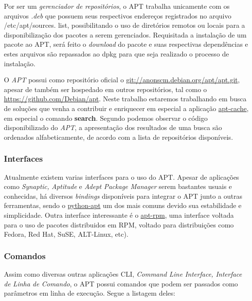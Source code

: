 Por ser um \textit{gerenciador de repositórios}, o {\code APT} trabalha unicamente com os arquivos \textit{.deb} que possuem seus respectivos endereços registrados no arquivo {\code/etc/apt/sources. list}, possibilitando o uso de diretórios remotos ou locais para a disponibilização dos pacotes a serem gerenciados. Requisitada a instalação de um pacote ao {\code APT}, será feito o \textit{download} do pacote e  suas respectivas dependências e estes arquivos são repassados ao {\code dpkg} para que seja realizado o processo de instalação.

O \textit{APT} possui como repositório oficial o \url{git://anonscm.debian.org/apt/apt.git}, apesar de também ser hospedado em outros repositórios, tal como o \url{https://github.com/Debian/apt}. Neste trabalho estaremos trabalhando em busca de soluções que venha a contribuir e enriquecer em especial a aplicação \href{https://github.com/Debian/apt/blob/debian/experimental/cmdline/apt-cache.cc}{apt-cache}, em especial o comando \textbf{search}. Segundo podemos observar o código disponibilizado do \textit{APT}, a apresentação dos resultados de uma busca são ordenados alfabeticamente, de acordo com a lista de repositórios disponíveis.


\subsubsection*{Interfaces} %
\label{ssub:interfaces}
Atualmente existem varias interfaces para o uso do APT. Apesar de aplicações como \textit{Synaptic, Aptitude} e \textit{Adept Package Manager} serem bastantes usuais e conhecidas, há diversos \textit{bindings} disponíveis para integrar o APT junto a outras ferramentas, sendo o \href{https://apt.alioth.debian.org/python-apt-doc/library/index.html}{python-apt} um dos mais comuns  devido sua estabilidade e simplicidade. Outra interface interessante é o \href{http://apt-rpm.org/about.shtml}{apt-rpm}, uma interface voltada para o uso de pacotes distribuidos em RPM, voltado para distribuições como Fedora, Red Hat, SuSE, ALT-Linux, etc)\cite{apt-rpm}.

\subsubsection*{Comandos} %
\label{ssub:comandos}

Assim como diversas outras aplicações CLI, \textit{Command Line Interface, Interface de Linha de Comando}, o APT possui comandos que podem ser passados como parâmetros em linha de execução. Segue a listagem deles:

